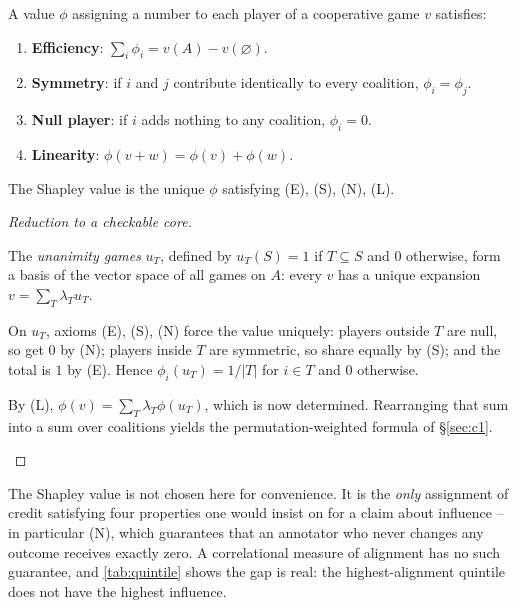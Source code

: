 \begin{definition}[Axioms]
A value $\phi$ assigning a number to each player of a cooperative game $v$
satisfies:
\begin{enumerate}
\item[(E)] \textbf{Efficiency}: $\sum_i \phi_i = v(A) - v(\varnothing)$.
\item[(S)] \textbf{Symmetry}: if $i$ and $j$ contribute identically to every
      coalition, $\phi_i = \phi_j$.
\item[(N)] \textbf{Null player}: if $i$ adds nothing to any coalition,
      $\phi_i = 0$.
\item[(L)] \textbf{Linearity}: $\phi(v+w) = \phi(v)+\phi(w)$.
\end{enumerate}
\end{definition}

\begin{theorem}
The Shapley value is the unique $\phi$ satisfying (E), (S), (N), (L).
\end{theorem}
\begin{proof}
[Reduction to a checkable core]
\begin{steps}
\item The \emph{unanimity games} $u_T$, defined by $u_T(S)=1$ if
$T\subseteq S$ and $0$ otherwise, form a basis of the vector space of all games
on $A$: every $v$ has a unique expansion $v=\sum_T \lambda_T u_T$.
\item On $u_T$, axioms (E), (S), (N) force the value uniquely: players
outside $T$ are null, so get $0$ by (N); players inside $T$ are symmetric, so
share equally by (S); and the total is $1$ by (E). Hence
$\phi_i(u_T) = 1/|T|$ for $i \in T$ and $0$ otherwise.
\item By (L), $\phi(v) = \sum_T \lambda_T \phi(u_T)$, which is now
determined. Rearranging that sum into a sum over coalitions yields the
permutation-weighted formula of §\ref{sec:c1}.
\end{steps}
\end{proof}

\begin{remark}
The Shapley value is not chosen here for convenience. It is the \emph{only}
assignment of credit satisfying four properties one would insist on for a claim
about influence -- in particular (N), which guarantees that an annotator who
never changes any outcome receives exactly zero. A correlational measure of
alignment has no such guarantee, and \cref{tab:quintile} shows the gap is real:
the highest-alignment quintile does not have the highest influence.
\end{remark}
